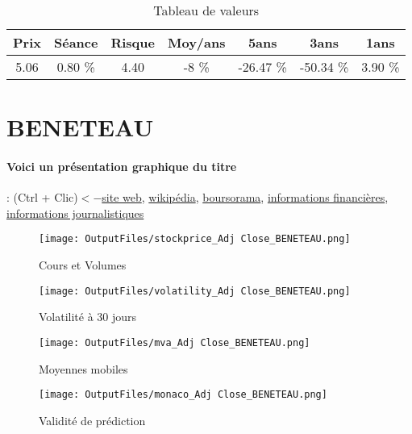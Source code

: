 \documentclass[11pt,a4paper]{report}%
\begin{document}
\begin{table}[H]
  \centering
    \begin{tabular}{|c|c|c|c|c|c|c|}
    \hline
    Prix & Séance & Risque  & Moy/ans & 5ans & 3ans & 1ans \\
    \hline
    5.06 &    0.80 \%    & 4.40 & -8 \% & -26.47 \% & -50.34 \% & 3.90 \% \\
    \hline
    \end{tabular}%
        \label{tab:table_AIR FRANCE KLM}%
      \caption{Tableau de valeurs}
\end{table}%

\newpage

\section{BENETEAU}

\paragraph{Voici un présentation graphique du titre} : (Ctrl + Clic)$<-$\href{https://finances.beneteau-group.com/accueil}{site web}, \href{https://fr.wikipedia.org/wiki/Groupe_Beneteau}{wikipédia}, \href{https://www.boursorama.com/cours/1rPBEN}{boursorama}, \href{https://www.qwant.com/?q=site:https:%2f%2fwww.easybourse.com%2faction-societe%2fBENETEAU&t=web&client=ext-firefox-hp}{informations financières}, \href{https://bourse.lerevenu.com/cours-de-bourse/fiche-valeur-synthese/BENETEAU/BEN-FR}{informations journalistiques}
\begin{figure}[!htb]
   \begin{minipage}{0.5\textwidth}
     \centering
     \texttt{[image: OutputFiles/stockprice\_Adj Close\_BENETEAU.png]}
     \caption{Cours et Volumes}\label{Fig:price_BENETEAU}
   \end{minipage}\hfill
   \begin{minipage}{0.5\textwidth}
     \centering
     \texttt{[image: OutputFiles/volatility\_Adj Close\_BENETEAU.png]}
     \caption{Volatilité à 30 jours}\label{Fig:volat_BENETEAU}
   \end{minipage}
\end{figure}
\begin{figure}[!htb]
   \begin{minipage}{0.5\textwidth}
     \centering
     \texttt{[image: OutputFiles/mva\_Adj Close\_BENETEAU.png]}
     \caption{Moyennes mobiles}\label{Fig:mva_BENETEAU}
   \end{minipage}\hfill
   \begin{minipage}{0.5\textwidth}
     \centering
     \texttt{[image: OutputFiles/monaco\_Adj Close\_BENETEAU.png]}
     \caption{Validité de prédiction}\label{Fig:prediction_BENETEAU}
   \end{minipage}
\end{figure}
\end{document}
